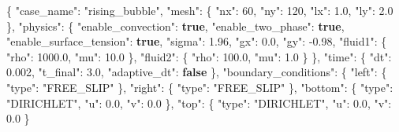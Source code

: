 \documentclass[
  french,
]{article}
\newenvironment{Shaded}{}{}
\newcommand{\DataTypeTok}[1]{\textcolor[rgb]{0.56,0.13,0.00}{#1}}
\newcommand{\DecValTok}[1]{\textcolor[rgb]{0.25,0.63,0.44}{#1}}
\newcommand{\FloatTok}[1]{\textcolor[rgb]{0.25,0.63,0.44}{#1}}
\newcommand{\FunctionTok}[1]{\textcolor[rgb]{0.02,0.16,0.49}{#1}}
\newcommand{\KeywordTok}[1]{\textcolor[rgb]{0.00,0.44,0.13}{\textbf{#1}}}
\newcommand{\StringTok}[1]{\textcolor[rgb]{0.25,0.44,0.63}{#1}}
\begin{document}
\begin{Shaded}
\begin{Highlighting}[]
\FunctionTok{\{}
  \DataTypeTok{"case\_name"}\FunctionTok{:} \StringTok{"rising\_bubble"}\FunctionTok{,}
  \DataTypeTok{"mesh"}\FunctionTok{:} \FunctionTok{\{} \DataTypeTok{"nx"}\FunctionTok{:} \DecValTok{60}\FunctionTok{,} \DataTypeTok{"ny"}\FunctionTok{:} \DecValTok{120}\FunctionTok{,} \DataTypeTok{"lx"}\FunctionTok{:} \FloatTok{1.0}\FunctionTok{,} \DataTypeTok{"ly"}\FunctionTok{:} \FloatTok{2.0} \FunctionTok{\},}
  \DataTypeTok{"physics"}\FunctionTok{:} \FunctionTok{\{}
    \DataTypeTok{"enable\_convection"}\FunctionTok{:} \KeywordTok{true}\FunctionTok{,}
    \DataTypeTok{"enable\_two\_phase"}\FunctionTok{:} \KeywordTok{true}\FunctionTok{,}
    \DataTypeTok{"enable\_surface\_tension"}\FunctionTok{:} \KeywordTok{true}\FunctionTok{,}
    \DataTypeTok{"sigma"}\FunctionTok{:} \FloatTok{1.96}\FunctionTok{,}
    \DataTypeTok{"gx"}\FunctionTok{:} \FloatTok{0.0}\FunctionTok{,} \DataTypeTok{"gy"}\FunctionTok{:} \FloatTok{{-}0.98}\FunctionTok{,}
    \DataTypeTok{"fluid1"}\FunctionTok{:} \FunctionTok{\{} \DataTypeTok{"rho"}\FunctionTok{:} \FloatTok{1000.0}\FunctionTok{,} \DataTypeTok{"mu"}\FunctionTok{:} \FloatTok{10.0} \FunctionTok{\},}
    \DataTypeTok{"fluid2"}\FunctionTok{:} \FunctionTok{\{} \DataTypeTok{"rho"}\FunctionTok{:} \FloatTok{100.0}\FunctionTok{,}  \DataTypeTok{"mu"}\FunctionTok{:} \FloatTok{1.0} \FunctionTok{\}}
  \FunctionTok{\},}
  \DataTypeTok{"time"}\FunctionTok{:} \FunctionTok{\{} \DataTypeTok{"dt"}\FunctionTok{:} \FloatTok{0.002}\FunctionTok{,} \DataTypeTok{"t\_final"}\FunctionTok{:} \FloatTok{3.0}\FunctionTok{,} \DataTypeTok{"adaptive\_dt"}\FunctionTok{:} \KeywordTok{false} \FunctionTok{\},}
  \DataTypeTok{"boundary\_conditions"}\FunctionTok{:} \FunctionTok{\{}
    \DataTypeTok{"left"}\FunctionTok{:}   \FunctionTok{\{} \DataTypeTok{"type"}\FunctionTok{:} \StringTok{"FREE\_SLIP"} \FunctionTok{\},}
    \DataTypeTok{"right"}\FunctionTok{:}  \FunctionTok{\{} \DataTypeTok{"type"}\FunctionTok{:} \StringTok{"FREE\_SLIP"} \FunctionTok{\},}
    \DataTypeTok{"bottom"}\FunctionTok{:} \FunctionTok{\{} \DataTypeTok{"type"}\FunctionTok{:} \StringTok{"DIRICHLET"}\FunctionTok{,} \DataTypeTok{"u"}\FunctionTok{:} \FloatTok{0.0}\FunctionTok{,} \DataTypeTok{"v"}\FunctionTok{:} \FloatTok{0.0} \FunctionTok{\},}
    \DataTypeTok{"top"}\FunctionTok{:}    \FunctionTok{\{} \DataTypeTok{"type"}\FunctionTok{:} \StringTok{"DIRICHLET"}\FunctionTok{,} \DataTypeTok{"u"}\FunctionTok{:} \FloatTok{0.0}\FunctionTok{,} \DataTypeTok{"v"}\FunctionTok{:} \FloatTok{0.0} \FunctionTok{\}}

\end{Highlighting}
\end{Shaded}
\end{document}
